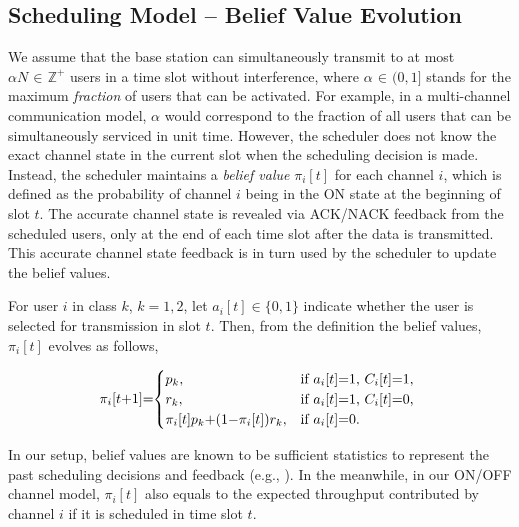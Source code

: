 \documentclass[11pt,twocolumn]{IEEEtran}
\begin{document}
\subsection{Scheduling Model -- Belief Value Evolution}

We assume that the base station can simultaneously transmit to at most $\alpha N \hspace{1pt}{\in}\hspace{1pt}\mathbb{Z}^+$ users in a time slot without interference, where $\alpha \hspace{1pt}{\in}\hspace{1pt}(0,1]$ stands for the maximum \emph{fraction} of users that can be activated. For example, in a multi-channel communication model, $\alpha$ would correspond to the fraction of all users that can be simultaneously serviced in unit time. However, the scheduler does not know the exact channel state in the current slot when the scheduling decision is made. Instead, the scheduler maintains a \emph{belief value} $\pi_i[t]$ for each channel $i$, which is defined as the probability of channel $i$ being in the ON state at the beginning of slot $t$. The accurate channel state is revealed via ACK/NACK feedback from the scheduled users, only at the end of each time slot after the data is transmitted. This accurate channel state feedback is in turn used by the scheduler to update the belief values.

For user $i$ in class $k$, $k{=}1,2$, let $a_i[t] {\in} \{0,1\}$ indicate whether the user is selected for transmission in slot $t$. Then, from the definition the belief values, $\pi_i[t]$ evolves as follows,

\begin{align}
\label{eq:evolve}
\hspace{-3pt}\pi_i[t{+}1]{=}\hspace{-2pt}
\begin{cases}
p_k,& \text{if $a_i[t]{=}1$, $C_i[t]{=}1$,}\\
r_k,& \text{if $a_i[t]{=}1$, $C_i[t]{=} 0$,}\\
\pi_i[t] p_k{+}(1{-}\pi_i[t])r_k, & \text{if $a_i[t]{=}0.$}
\end{cases}
\end{align}

In our setup, belief values are known to be sufficient statistics to represent the past scheduling decisions and feedback (e.g., \cite{Javidi,Sondik_thesis}). In the meanwhile, in our ON/OFF channel model, $\pi_i[t]$ also equals to the expected throughput contributed by channel $i$ if it is scheduled in time slot $t$.
\end{document}
